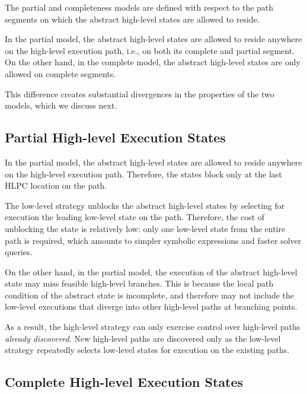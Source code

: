 The partial and completeness models are defined with respect to the path segments on which the abstract high-level states are allowed to reside.

In the partial model, the abstract high-level states are allowed to reside anywhere on the high-level execution path, i.e., on both its complete and partial segment.
%
On the other hand, in the complete model, the abstract high-level states are only allowed on complete segments.

This difference creates substantial divergences in the properties of the two models, which we discuss next.

\subsection{Partial High-level Execution States}

In the partial model, the abstract high-level states are allowed to reside anywhere on the high-level execution path.
%
Therefore, the states block only at the last HLPC location on the path.

The low-level strategy unblocks the abstract high-level states by selecting for execution the leading low-level state on the path.
%
Therefore, the cost of unblocking the state is relatively low: only one low-level state from the entire path is required, which amounts to simpler symbolic expressions and faster solver queries.

On the other hand, in the partial model, the execution of the abstract high-level state may miss feasible high-level branches.
%
This is because the local path condition of the abstract state is incomplete, and therefore may not include the low-level executions that diverge into other high-level paths at branching points.

As a result, the high-level strategy can only exercise control over high-level paths \emph{already discovered}.
%
New high-level paths are discovered only as the low-level strategy repeatedly selects low-level states for execution on the existing paths.


\subsection{Complete High-level Execution States}


